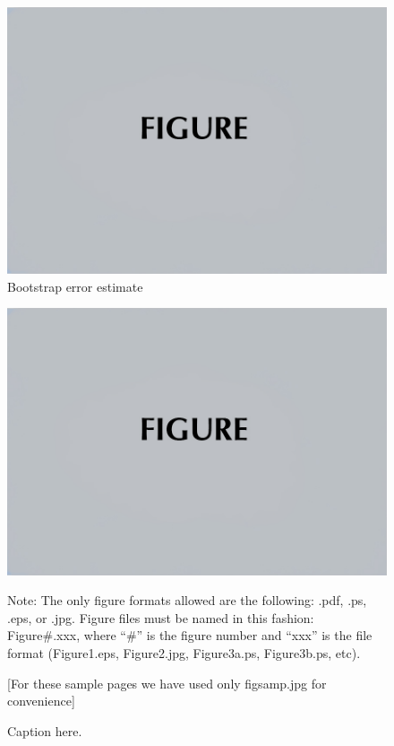 \begin{figure}[ht]
\includegraphics[width=\reprintcolumnwidth]{figsamp.jpg}
\caption{\label{fig:FIG7}{Bootstrap error estimate}}
\end{figure}







\begin{figure}[ht]
\includegraphics[width=\reprintcolumnwidth]{figsamp.jpg}
\caption{\label{fig:FIG1}{Caption here.}}

\raggedright
{\color{red}
Note: The only figure formats allowed are the following:
.pdf, .ps, .eps, or .jpg. Figure files must be named in this fashion:
Figure\#.xxx, where ``\#'' is the figure number and ``xxx'' is the file format
(Figure1.eps, Figure2.jpg, Figure3a.ps, Figure3b.ps, etc).
}

[For these sample pages we have used only figsamp.jpg for convenience]
\end{figure}


